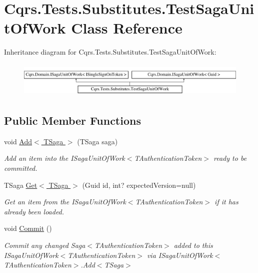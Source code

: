 \hypertarget{classCqrs_1_1Tests_1_1Substitutes_1_1TestSagaUnitOfWork}{}\section{Cqrs.\+Tests.\+Substitutes.\+Test\+Saga\+Unit\+Of\+Work Class Reference}
\label{classCqrs_1_1Tests_1_1Substitutes_1_1TestSagaUnitOfWork}
Inheritance diagram for Cqrs.\+Tests.\+Substitutes.\+Test\+Saga\+Unit\+Of\+Work\+:\begin{figure}[H]
\begin{center}
\leavevmode
\includegraphics[height=1.696970cm]{classCqrs_1_1Tests_1_1Substitutes_1_1TestSagaUnitOfWork}
\end{center}
\end{figure}
\subsection*{Public Member Functions}
\begin{DoxyCompactItemize}
\item 
void \hyperlink{classCqrs_1_1Tests_1_1Substitutes_1_1TestSagaUnitOfWork_a9469938dc87569d5fa29aea5c97e610f}{Add$<$ T\+Saga $>$} (T\+Saga saga)
\begin{DoxyCompactList}\small\item\em Add an item into the I\+Saga\+Unit\+Of\+Work$<$\+T\+Authentication\+Token$>$ ready to be committed. \end{DoxyCompactList}\item 
T\+Saga \hyperlink{classCqrs_1_1Tests_1_1Substitutes_1_1TestSagaUnitOfWork_a5b301e0f8efa469bcd164f032fffad98}{Get$<$ T\+Saga $>$} (Guid id, int? expected\+Version=null)
\begin{DoxyCompactList}\small\item\em Get an item from the I\+Saga\+Unit\+Of\+Work$<$\+T\+Authentication\+Token$>$ if it has already been loaded. \end{DoxyCompactList}\item 
void \hyperlink{classCqrs_1_1Tests_1_1Substitutes_1_1TestSagaUnitOfWork_ab50323c2f6a97c5f7eefa0d718dd7053}{Commit} ()
\begin{DoxyCompactList}\small\item\em Commit any changed Saga$<$\+T\+Authentication\+Token$>$ added to this I\+Saga\+Unit\+Of\+Work$<$\+T\+Authentication\+Token$>$ via I\+Saga\+Unit\+Of\+Work$<$\+T\+Authentication\+Token$>$.\+Add$<$\+T\+Saga$>$ \end{DoxyCompactList}\end{DoxyCompactItemize}
